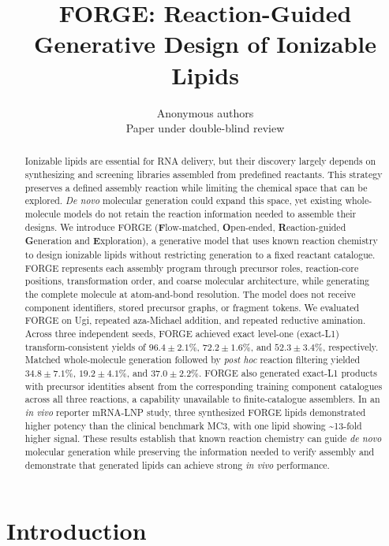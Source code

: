 \documentclass{article}
\title{FORGE: Reaction-Guided Generative Design of Ionizable Lipids}
\author{Anonymous authors\\Paper under double-blind review}
\theoremstyle{definition}
\begin{document}
\maketitle


 \begin{abstract}
  Ionizable lipids are essential for RNA delivery, but their discovery largely depends on synthesizing and screening libraries assembled from predefined reactants. This strategy preserves a defined assembly reaction while limiting the chemical space that can be explored. \textit{De novo} molecular generation could expand this space, yet existing whole-molecule models do not retain the reaction information needed to assemble their designs. We introduce FORGE (\textbf{F}low-matched, \textbf{O}pen-ended, \textbf{R}eaction-guided \textbf{G}eneration and \textbf{E}xploration), a generative model that uses known reaction chemistry to design ionizable lipids without restricting generation to a fixed reactant catalogue. FORGE represents each assembly program through precursor roles, reaction-core positions, transformation order, and coarse
  molecular architecture, while generating the complete molecule at atom-and-bond resolution. The model does not receive component identifiers, stored precursor graphs, or fragment tokens. We evaluated FORGE on Ugi, repeated aza-Michael addition, and repeated reductive amination. Across three independent seeds, FORGE achieved exact level-one (exact-L1) transform-consistent yields of $96.4\pm2.1\%$, $72.2\pm1.6\%$, and $52.3\pm3.4\%$, respectively. Matched whole-molecule
  generation followed by \textit{post hoc} reaction filtering yielded $34.8\pm7.1\%$, $19.2\pm4.1\%$, and $37.0\pm2.2\%$. FORGE also generated exact-L1 products with precursor identities absent from the corresponding training component catalogues across all three reactions, a capability unavailable to finite-catalogue assemblers.  In an \textit{in vivo} reporter mRNA-LNP study, three synthesized FORGE lipids demonstrated higher potency than the clinical benchmark MC3, with one lipid showing \textasciitilde13-fold higher signal. These results establish that known reaction chemistry can guide \textit{de novo} molecular generation while preserving the information needed to verify assembly and demonstrate that generated lipids can achieve strong \textit{in vivo} performance.
  \end{abstract}

\section{Introduction}
\end{document}
